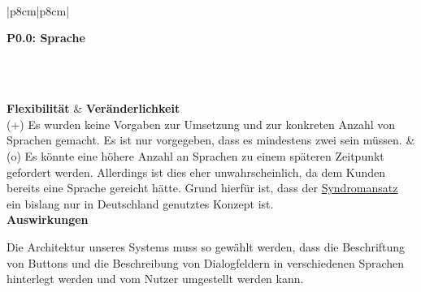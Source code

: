 \documentclass[enabledeprecatedfontcommands,fontsize=11pt,paper=a4,twoside]{scrartcl}
\newcounter{one}
\newcounter{two}[one]
\newcommand{\tone}{0\theone}
\newcommand{\two}{\stepcounter{two}0\thetwo}
\begin{document}
\\ \\ \\
\begin{tabular} {|p{8cm}|p{8cm}|}
	\hline
	 {\parbox{16cm}{\textbf{\hypertarget{gg}{P\tone.\two}: Sprache}} }\\ \hline \hline
	\rule{0pt}{7ex}\\ [1ex] \hline
	\textbf{Flexibilität}  & \textbf{Veränderlichkeit} \\
	(+) Es wurden keine Vorgaben zur Umsetzung und zur konkreten Anzahl von Sprachen gemacht. Es ist nur vorgegeben, dass es mindestens zwei sein müssen. &
	(o) Es könnte eine höhere Anzahl an Sprachen zu einem späteren Zeitpunkt gefordert werden. Allerdings ist dies eher unwahrscheinlich, da dem Kunden bereits eine Sprache gereicht hätte. Grund hierfür ist, dass der \hyperlink{Syndromansatz}{Syndromansatz} ein bislang nur in Deutschland genutztes Konzept ist. \\ \hline
	 {\textbf{Auswirkungen}} \\
	 {\parbox{16cm}{Die Architektur unseres Systems muss so gewählt werden, dass die Beschriftung von Buttons und die Beschreibung von Dialogfeldern in verschiedenen Sprachen hinterlegt werden und vom Nutzer umgestellt werden kann.} }\\ \hline
\end{tabular}
\newpage
\end{document}
